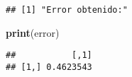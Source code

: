 \documentclass[]{article}
\newenvironment{Shaded}{\begin{snugshade}}{\end{snugshade}}
\newcommand{\KeywordTok}[1]{\textcolor[rgb]{0.13,0.29,0.53}{\textbf{{#1}}}}
\newcommand{\NormalTok}[1]{{#1}}
\begin{document}
\begin{verbatim}
## [1] "Error obtenido:"
\end{verbatim}

\begin{Shaded}
\begin{Highlighting}[]
\KeywordTok{print}\NormalTok{(error)}
\end{Highlighting}
\end{Shaded}

\begin{verbatim}
##           [,1]
## [1,] 0.4623543
\end{verbatim}
\end{document}
